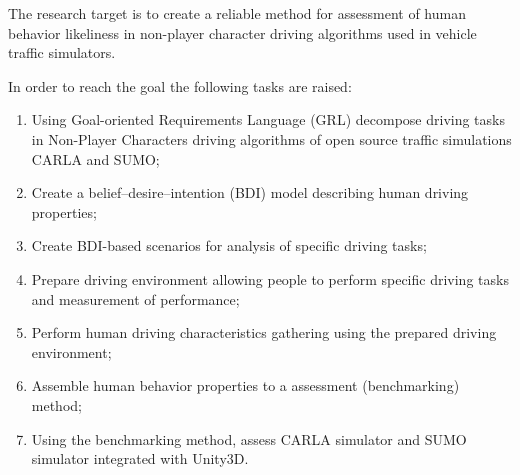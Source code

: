 \documentclass{VUMIFPS-master-intro}
\begin{document}
The research target is to create a reliable method for assessment of human behavior likeliness in non-player character driving algorithms used in vehicle traffic simulators.

In order to reach the goal the following tasks are raised:
\begin{enumerate}
	\item Using Goal-oriented Requirements Language (GRL) decompose driving tasks in Non-Player Characters driving algorithms of open source traffic simulations CARLA and SUMO;
	\item Create a belief–desire–intention (BDI) model describing human driving properties;
	\item Create BDI-based scenarios for analysis of specific driving tasks;
	\item Prepare driving environment allowing people to perform specific driving tasks and measurement of performance;
	\item Perform human driving characteristics gathering using the prepared driving environment;
	\item Assemble human behavior properties to a assessment (benchmarking) method;
	\item Using the benchmarking method, assess CARLA simulator and SUMO simulator integrated with Unity3D.
\end{enumerate}

\end{document}
